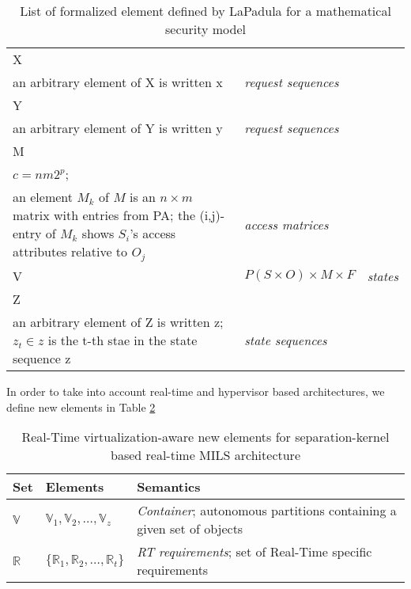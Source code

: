\begin{table}[ht]
\begin{tabular}{|p{3cm}|p{6cm}|p{7cm}|}
\hline
X & \begin{minipage}{5.5cm}$R^T$\\ an arbitrary element of X is written x\end{minipage} & {\it request sequences} \\
\hline
Y & \begin{minipage}{5.5cm}$D^T$\\ an arbitrary element of Y is written y\end{minipage} & {\it request sequences} \\
\hline
M & \begin{minipage}{5.5cm}$\{M_1, M_2, \hdots, M_c\}$,\\ $c=nm2^p$;\\an element $M_k$ of $M$ is an $n
\times m$ matrix with entries from PA; the (i,j)-entry of $M_k$ shows $S_i$'s access attributes
relative to $O_j$\end{minipage} & {\it access matrices} \\
\hline
V & $P(S \times O) \times M \times F$ & {\it states} \\
\hline
Z & \begin{minipage}{5.5cm}$V^T$\\ an arbitrary element of Z is written z; $z_t \in z$ is the t-th
stae in the state sequence z\end{minipage} & {\it state sequences} \\
\hline
\end{tabular}
\caption{List of formalized element defined by LaPadula for a mathematical security model\label{tab:secmathfund}}
\end{table}

In order to take into account real-time and hypervisor based architectures, we define new elements
in Table \ref{tab:secmathfundmils}

\begin{table}[ht]
\begin{tabular}{|p{3cm}|p{6cm}|p{7cm}|}
\hline
Set & Elements & Semantics \\
\hline
\hline
$\mathbb{V}$ & ${\mathbb{V}_1, \mathbb{V}_2, \hdots, \mathbb{V}_z}$ & {\it Container}; autonomous partitions containing a given set of objects \\
\hline
$\mathbb{R}$ & $\{\mathbb{R}_1, \mathbb{R}_2, \hdots, \mathbb{R}_t\}$ & {\it RT requirements}; set
of Real-Time specific requirements \\
\hline
\end{tabular}
\caption{Real-Time virtualization-aware new elements for separation-kernel based real-time MILS
architecture\label{tab:secmathfundmils}}
\end{table}

